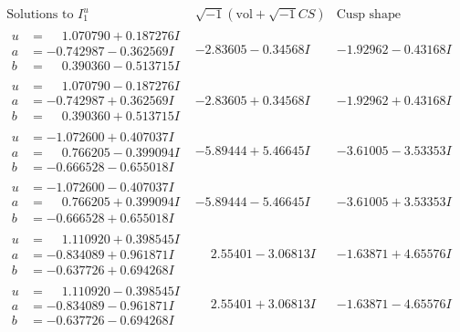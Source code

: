 \documentclass[1p]{elsarticle_modified}
\theoremstyle{definition}
\newcommand{\I}{\sqrt{-1}}
\begin{document}
$$\begin{array}{c|c|c}  
\text{Solutions to }I^u_{1}& \I (\text{vol} + \sqrt{-1}CS) & \text{Cusp shape}\\
 \hline 
\begin{aligned}
u &= \phantom{-}1.070790 + 0.187276 I \\
a &= -0.742987 - 0.362569 I \\
b &= \phantom{-}0.390360 - 0.513715 I\end{aligned}
 & -2.83605 - 0.34568 I & -1.92962 - 0.43168 I \\ \hline\begin{aligned}
u &= \phantom{-}1.070790 - 0.187276 I \\
a &= -0.742987 + 0.362569 I \\
b &= \phantom{-}0.390360 + 0.513715 I\end{aligned}
 & -2.83605 + 0.34568 I & -1.92962 + 0.43168 I \\ \hline\begin{aligned}
u &= -1.072600 + 0.407037 I \\
a &= \phantom{-}0.766205 - 0.399094 I \\
b &= -0.666528 - 0.655018 I\end{aligned}
 & -5.89444 + 5.46645 I & -3.61005 - 3.53353 I \\ \hline\begin{aligned}
u &= -1.072600 - 0.407037 I \\
a &= \phantom{-}0.766205 + 0.399094 I \\
b &= -0.666528 + 0.655018 I\end{aligned}
 & -5.89444 - 5.46645 I & -3.61005 + 3.53353 I \\ \hline\begin{aligned}
u &= \phantom{-}1.110920 + 0.398545 I \\
a &= -0.834089 + 0.961871 I \\
b &= -0.637726 + 0.694268 I\end{aligned}
 & \phantom{-}2.55401 - 3.06813 I & -1.63871 + 4.65576 I \\ \hline\begin{aligned}
u &= \phantom{-}1.110920 - 0.398545 I \\
a &= -0.834089 - 0.961871 I \\
b &= -0.637726 - 0.694268 I\end{aligned}
 & \phantom{-}2.55401 + 3.06813 I & -1.63871 - 4.65576 I \\ \hline\begin{aligned}

\end{aligned}
\end{array}$$
\end{document}
